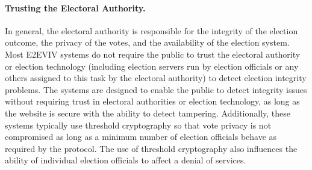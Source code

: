 \paragraph{Trusting the Electoral Authority.} 

In general, the electoral authority is responsible for the integrity of the election outcome, the privacy of the votes, and the availability of the election system. Most E2EVIV systems do not require the public to trust the electoral authority or election technology (including election servers run by election officials or any others assigned to this task by the electoral authority) to detect election integrity problems. The systems are designed to enable the public to detect integrity issues without requiring trust in electoral authorities or election technology, as long as the website is secure with the ability to detect tampering. Additionally, these systems typically use threshold cryptography so that vote privacy is not compromised as long as a minimum number of election officials behave as required by the protocol. The use of threshold cryptography also influences the ability of individual election officials to affect a denial of services. 

